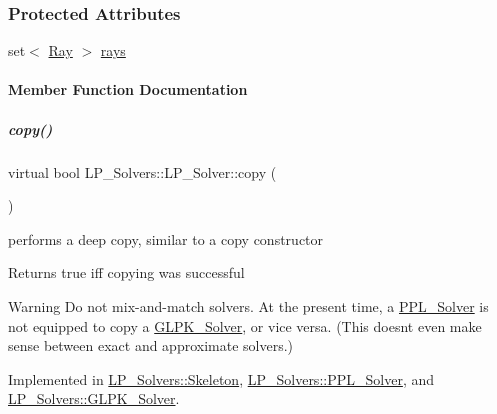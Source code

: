 \subsubsection*{Protected Attributes}
\begin{DoxyCompactItemize}
\item 
set$<$ \hyperlink{group___c_l_s_solvers_class_l_p___solvers_1_1_ray}{Ray} $>$ \hyperlink{group___c_l_s_solvers_ad4c9fb3708c156496c23515c8e841374}{rays}
\end{DoxyCompactItemize}


\paragraph{Member Function Documentation}
\mbox{\label{group___c_l_s_solvers_a36c14a88e9d3ae9d9321acc7877236d0}} 
\subparagraph{\texorpdfstring{copy()}{copy()}}
{\footnotesize\ttfamily virtual bool L\+P\+\_\+\+Solvers\+::\+L\+P\+\_\+\+Solver\+::copy (\begin{DoxyParamCaption}\item[{const \hyperlink{group___c_l_s_solvers_class_l_p___solvers_1_1_l_p___solver}{L\+P\+\_\+\+Solver} $\ast$}]{ }\end{DoxyParamCaption})\hspace{0.3cm}{\ttfamily [pure virtual]}}



performs a deep copy, similar to a copy constructor 

\begin{DoxyReturn}{Returns}
{\ttfamily true} iff copying was successful 
\end{DoxyReturn}
\begin{DoxyWarning}{Warning}
Do not mix-\/and-\/match solvers. At the present time, a \hyperlink{group___c_l_s_solvers_class_l_p___solvers_1_1_p_p_l___solver}{P\+P\+L\+\_\+\+Solver} is not equipped to copy a \hyperlink{group___c_l_s_solvers_class_l_p___solvers_1_1_g_l_p_k___solver}{G\+L\+P\+K\+\_\+\+Solver}, or vice versa. (This doesn\textquotesingle{}t even make sense between exact and approximate solvers.) 
\end{DoxyWarning}


Implemented in \hyperlink{group___c_l_s_solvers_a242f1dc35468e2326e6f7c10bc0d0fd4}{L\+P\+\_\+\+Solvers\+::\+Skeleton}, \hyperlink{group___c_l_s_solvers_acc03418759754dbeda266dba9eefe98b}{L\+P\+\_\+\+Solvers\+::\+P\+P\+L\+\_\+\+Solver}, and \hyperlink{group___c_l_s_solvers_a43a745172366a1dfd893dee00f0ce0fb}{L\+P\+\_\+\+Solvers\+::\+G\+L\+P\+K\+\_\+\+Solver}.

